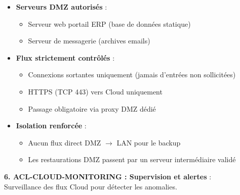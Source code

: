 \begin{itemize}
  \item \textbf{Serveurs DMZ autorisés} :
  \begin{itemize}
    \item Serveur web portail ERP (base de données statique)
    \item Serveur de messagerie (archives emails)
  \end{itemize}
  
  \item \textbf{Flux strictement contrôlés} :
  \begin{itemize}
    \item Connexions sortantes uniquement (jamais d'entrées non sollicitées)
    \item HTTPS (TCP 443) vers Cloud uniquement
    \item Passage obligatoire via proxy DMZ dédié
  \end{itemize}
  
  \item \textbf{Isolation renforcée} :
  \begin{itemize}
    \item Aucun flux direct DMZ $\rightarrow$ LAN pour le backup
    \item Les restaurations DMZ passent par un serveur intermédiaire validé
  \end{itemize}
\end{itemize}

\newpage

\noindent \textbf{6. ACL-CLOUD-MONITORING : Supervision et alertes} :\\
Surveillance des flux Cloud pour détecter les anomalies.

